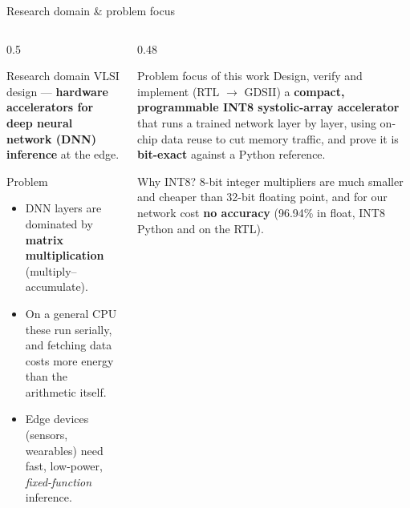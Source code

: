\documentclass[aspectratio=169,10pt,t]{beamer}
\begin{document}
\begin{frame}{Research domain \& problem focus}
  \begin{columns}[T]
    \begin{column}{0.5\textwidth}
      \begin{block}{Research domain}
        \small VLSI design --- \textbf{hardware accelerators for deep neural network (DNN) inference} at the edge.
      \end{block}
      \begin{block}{Problem}
        \small
        \begin{itemize}\setlength{\itemsep}{1pt}
          \item DNN layers are dominated by \textbf{matrix multiplication} (multiply--accumulate).
          \item On a general CPU these run serially, and fetching data costs more energy than the arithmetic itself.
          \item Edge devices (sensors, wearables) need fast, low-power, \emph{fixed-function} inference.
        \end{itemize}
      \end{block}
    \end{column}
    \begin{column}{0.48\textwidth}
      \begin{block}{Problem focus of this work}
        \small Design, verify and implement (RTL $\to$ GDSII) a \textbf{compact, programmable INT8 systolic-array
        accelerator} that runs a trained network layer by layer, using on-chip data reuse to cut memory traffic,
        and prove it is \textbf{bit-exact} against a Python reference.
      \end{block}
      \begin{block}{Why INT8?}
        \small 8-bit integer multipliers are much smaller and cheaper than 32-bit floating point, and for our network
        cost \textbf{no accuracy} (96.94\% in float, INT8 Python and on the RTL).
      \end{block}
    \end{column}
  \end{columns}
\end{frame}
\end{document}
